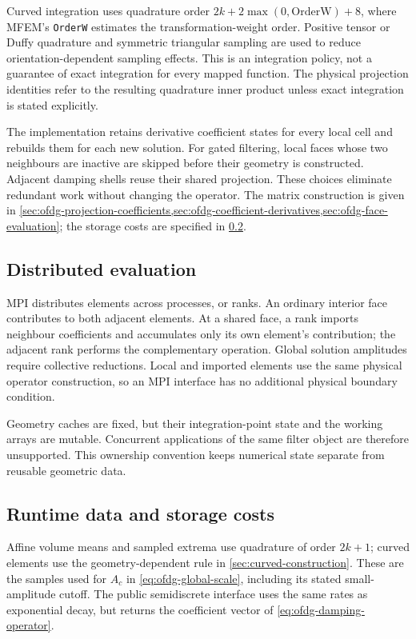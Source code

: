 Curved integration uses quadrature order
$2k+2\max(0,\mathrm{OrderW})+8$, where MFEM's \texttt{OrderW} estimates the
transformation-weight order. Positive tensor or Duffy quadrature and symmetric
triangular sampling are used to reduce orientation-dependent sampling effects.
This is an integration policy, not a guarantee of exact integration for every
mapped function. The physical projection identities refer to the resulting
quadrature inner product unless exact integration is stated explicitly.

The implementation retains derivative coefficient states for every local
cell and rebuilds them for each new solution. For gated filtering, local faces
whose two neighbours are inactive are skipped before their geometry is
constructed. Adjacent damping shells reuse their shared projection. These
choices eliminate redundant work without changing the operator. The matrix construction is given in
\cref{sec:ofdg-projection-coefficients,sec:ofdg-coefficient-derivatives,sec:ofdg-face-evaluation};
the storage costs are specified in \cref{sec:operator-storage}.

\subsection{Distributed evaluation}
MPI distributes elements across processes, or ranks. An ordinary interior
face contributes to both adjacent elements. At a shared face, a rank imports
neighbour coefficients and accumulates only its own element's contribution;
the adjacent rank performs the complementary operation. Global solution
amplitudes require collective reductions. Local and imported elements use the
same physical operator construction, so an MPI interface has no additional
physical boundary condition.

Geometry caches are fixed, but their integration-point state and the working
arrays are mutable. Concurrent applications of the same filter object are
therefore unsupported. This ownership convention keeps numerical state
separate from reusable geometric data.

\subsection{Runtime data and storage costs}
\label{sec:operator-storage}
Affine volume means and sampled extrema use quadrature of order $2k+1$;
curved elements use the geometry-dependent rule in
\cref{sec:curved-construction}. These are the samples used for $A_c$ in
\cref{eq:ofdg-global-scale}, including its stated small-amplitude cutoff.
The public semidiscrete interface uses the same rates as exponential decay,
but returns the coefficient vector of \cref{eq:ofdg-damping-operator}.

